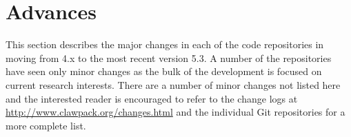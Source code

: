 %
%
%

\section{Advances} \label{sec:advances}

This section describes the major changes in each of the code repositories
in moving from \clawpack 4.x to the most recent version 5.3.
A number of the repositories have seen only minor changes as the bulk of the
development is focused on current research interests.  There are a number of
minor changes not listed here and the interested reader is encouraged to refer
to the change logs at \url{http://www.clawpack.org/changes.html} and the
individual \clawpack Git repositories for a more complete list.








